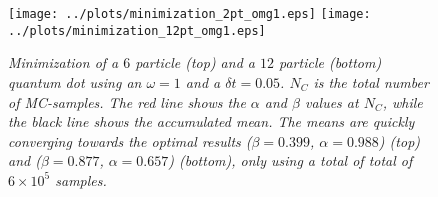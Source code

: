 \documentclass[a4paper,10pt,twocolumn]{article} %
\newcommand{\ts}[1]{\textbf{#1}}
\newcommand{\expec}[1]{\langle{}{#1}\rangle{}}
\begin{document}
\begin{figure}[h!]
\begin{center}
\caption{{\it%
	Minimization of a $6$ particle (top) and a $12$ particle (bottom) quantum dot using an $\omega = 1$ and a $\delta t=0.05$. $N_C$ is the total number of MC-samples. 
	The red line shows the $\alpha$ and $\beta$ values at $N_C$, while the black line shows the accumulated mean.
	The means are quickly converging towards the optimal results ($\beta=0.399$, $\alpha=0.988$) (top) and ($\beta=0.877$, $\alpha=0.657$) (bottom), 
	only using a total of total of $6\times10^5$ samples. }}
\vspace{-.3cm}
	\texttt{[image: ../plots/minimization\_2pt\_omg1.eps]}
	\texttt{[image: ../plots/minimization\_12pt\_omg1.eps]}
\end{center}
\vspace{-.8cm}
\end{figure}



\end{document}
